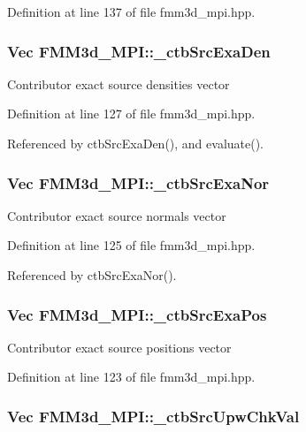 Definition at line 137 of file fmm3d\_\-mpi.hpp.
\subsubsection{\setlength{\rightskip}{0pt plus 5cm}Vec {\bf FMM3d\_\-MPI::\_\-ctb\-Src\-Exa\-Den}\hspace{0.3cm}{\tt  [protected]}}\label{classFMM3d__MPI_7050795cee04b05f609fc167760e68d4_7050795cee04b05f609fc167760e68d4}


Contributor exact source densities vector 

Definition at line 127 of file fmm3d\_\-mpi.hpp.

Referenced by ctb\-Src\-Exa\-Den(), and evaluate().
\subsubsection{\setlength{\rightskip}{0pt plus 5cm}Vec {\bf FMM3d\_\-MPI::\_\-ctb\-Src\-Exa\-Nor}\hspace{0.3cm}{\tt  [protected]}}\label{classFMM3d__MPI_78daf1e3ebe51dfbe9cbcd465264f664_78daf1e3ebe51dfbe9cbcd465264f664}


Contributor exact source normals vector 

Definition at line 125 of file fmm3d\_\-mpi.hpp.

Referenced by ctb\-Src\-Exa\-Nor().
\subsubsection{\setlength{\rightskip}{0pt plus 5cm}Vec {\bf FMM3d\_\-MPI::\_\-ctb\-Src\-Exa\-Pos}\hspace{0.3cm}{\tt  [protected]}}\label{classFMM3d__MPI_2bb36a6577767ae6322668588e79a6c5_2bb36a6577767ae6322668588e79a6c5}


Contributor exact source positions vector 

Definition at line 123 of file fmm3d\_\-mpi.hpp.
\subsubsection{\setlength{\rightskip}{0pt plus 5cm}Vec {\bf FMM3d\_\-MPI::\_\-ctb\-Src\-Upw\-Chk\-Val}\hspace{0.3cm}{\tt  [protected]}}\label{classFMM3d__MPI_6a8abae7340bf4433e405eb43ea6bf0a_6a8abae7340bf4433e405eb43ea6bf0a}


